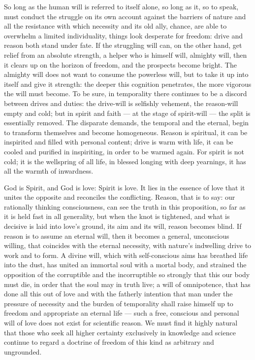 \documentclass[12pt,a4paper,openany]{book}
\newcommand{\opage}[1]{\marginnote{\footnotesize\textit{[#1]}}}
\begin{document}
\setcounter{footnote}{0}%
\opage{45}So long as the human will is referred to itself alone, so long as it, so to speak, must conduct the struggle on its own
account against the barriers of nature and all the resistance with which necessity and its old ally, chance, are able to
overwhelm a limited individuality, things look desperate for freedom: drive and reason both stand under fate. If the
struggling will can, on the other hand, get relief from an absolute strength, a helper who is himself will, almighty will,
then it clears up on the horizon of freedom, and the prospects become bright. The almighty will does not want to consume the
powerless will, but to take it up into itself and give it strength: the deeper this cognition penetrates, the more vigorous
the will must become. To be sure, in temporality there continues to be a discord between drives and duties: the drive-will is
selfishly vehement, the reason-will empty and cold; but in spirit and faith --- at the stage of spirit-will --- the split is
essentially removed. The disparate demands, the temporal and the eternal, begin to transform themselves and become homogeneous.
Reason is spiritual, it can be inspirited and filled with personal content; drive is warm with life, it can be cooled and
purified in inspiriting, in order to be warmed again. For spirit is not cold; it is the wellspring of all life, in blessed
longing with deep yearnings, it has all the warmth of inwardness.

God is Spirit, and God is love: Spirit is love. It lies in the essence of love that it unites the opposite and reconciles the
conflicting. Reason, that is to say: our rationally thinking consciousness, can see the truth in this proposition, so far as it
is held fast in all generality, but when the knot is tightened, and what is decisive is laid into love's ground, its aim and
its will, reason becomes blind. If reason is to assume an eternal will, then it becomes a general, unconscious willing, that
coincides with the eternal necessity, with nature's indwelling drive to work and to form. A divine will, which with
self-conscious aims has breathed life into the dust, has united an immortal soul with a
\setcounter{footnote}{0}%
\opage{46}mortal body, and strained the opposition of the corruptible and the incorruptible so strongly that this our body must die,
in order that the soul may in truth live; a will of omnipotence, that has done all this out of love and with the fatherly
intention that man under the pressure of necessity and the burden of temporality shall raise himself up to freedom and appropriate
an eternal life --- such a free, conscious and personal will of love does not exist for scientific reason. We must find it
highly natural that those who seek all higher certainty exclusively in knowledge and science continue to regard a doctrine of
freedom of this kind as arbitrary and ungrounded.
\end{document}
